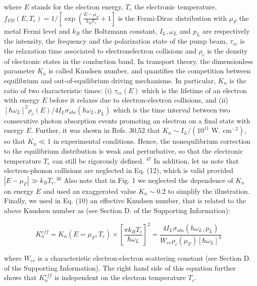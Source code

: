 \documentclass[10pt]{article}
\begin{document}
where $E$ stands for the electron energy, $T_{e}$ the electronic temperature, $f_{F D}\left(E, T_{e}\right)= 1 /\left[\exp \left(\frac{E-\mu_{F}}{k_{B} T_{e}}+1\right]\right.$ is the Fermi-Dirac distribution with $\mu_{F}$ the metal Fermi level and $k_{B}$ the Boltzmann constant, $I_{L}, \omega_{L}$ and $p_{L}$ are respectively the intensity, the frequency and the polarization state of the pump beam, $\tau_{e e}$ is the relaxation time associated to electronelectron collisions and $\rho_{c}$ is the density of electronic states in the conduction band. In transport theory, the dimensionless parameter $K_{n}$ is called Knudsen number, and quantifies the competition between equilibrium and out-of-equilibrium driving mechanisms. In particular, $K_{n}$ is the ratio of two characteristic times: (i) $\tau_{e e}(E)$ which is the lifetime of an electron with energy $E$ before it relaxes due to electron-electron collisions, and (ii)\\
$\left[\hbar \omega_{L}\right]^{2} \rho_{c}(E) / 4 I_{L} \sigma_{a b s}\left(\hbar \omega_{L}, p_{L}\right)$ which is the time interval between two consecutive photon absorption events promoting an electron on a final state with energy $E$. Further, it was shown in Refs. 30,52 that $K_{n} \sim I_{L} /\left(10^{11}\right.$ W. $\left.\mathrm{cm}^{-2}\right)$, so that $K_{n} \ll 1$ in experimental conditions. Hence, the nonequilibrium correction to the equilibrium distribution is weak and perturbative, so that the electronic temperature $T_{e}$ can still be rigorously defined. ${ }^{47}$ In addition, let us note that electron-phonon collisions are neglected in Eq. (12), which is valid provided $\left|E-\mu_{F}\right| \gg k_{B} T_{e} .{ }^{30}$ Also note that in Fig. 1 we neglected the dependence of $K_{n}$ on energy $E$ and used an exaggerated value $K_{n} \sim 0.2$ to simplify the illustration. Finally, we used in Eq. (10) an effective Knudsen number, that is related to the above Knudsen number as (see Section D. of the Supporting Information):


\begin{equation*}
K_{n}^{e f f}=K_{n}\left(E=\mu_{F}, T_{e}\right) \times\left[\frac{\pi k_{B} T_{e}}{\hbar \omega_{L}}\right]^{2}=\frac{4 I_{L} \sigma_{a b s}\left(\hbar \omega_{L}, p_{L}\right)}{W_{e e} \rho_{c}\left(\mu_{F}\right)\left[\hbar \omega_{L}\right]^{4}} \tag{14}
\end{equation*}


where $W_{e e}$ is a characteristic electron-electron scattering constant (see Section D. of the Supporting Information). The right hand side of this equation further shows that $K_{n}^{e f f}$ is independent on the electron temperature $T_{e}$.
\end{document}
